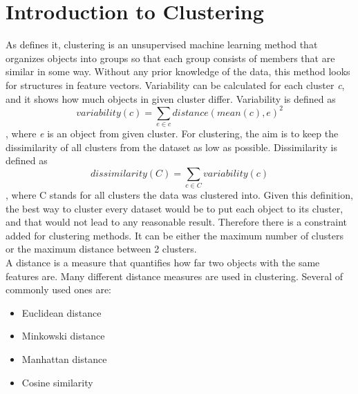 \documentclass[thesis=B,english]{FITthesis}[2012/10/20]
\begin{document}
\section{Introduction to Clustering}                                              
As \cite{guttag2016introduction} defines it, clustering is an unsupervised machine learning method that organizes objects into groups so that each group consists of members that are similar in some way.
Without any prior knowledge of the data, this method looks for structures in feature vectors.
Variability can be calculated for each cluster \textit{c}, and it shows how much objects in given cluster differ.
Variability is defined as $$ variability(c) = \sum_{e \in c} distance(mean(c), e)^2 $$, where \textit{e} is an object from given cluster.
For clustering, the aim is to keep the dissimilarity of all clusters from the dataset as low as possible.
Dissimilarity is defined as $$ dissimilarity(C) = \sum_{c \in C} variability(c) $$, where C stands for all clusters the data was clustered into.
Given this definition, the best way to cluster every dataset would be to put each object to its cluster, and that would not lead to any reasonable result.
Therefore there is a constraint added for clustering methods.                     
It can be either the maximum number of clusters or the maximum distance between 2 clusters. \\
                                                                                                                                      
A distance is a measure that quantifies how far two objects with the same features are.
Many different distance measures are used in clustering.                          
Several of commonly used ones are:                                                
\begin{itemize}                                                                   
    \item Euclidean distance                                                      
    \item Minkowski distance                                                      
    \item Manhattan distance                                                      
    \item Cosine similarity                                                       
\end{itemize}                                                                     
                                                                                  
\end{document}
